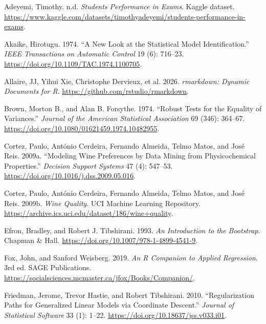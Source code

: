 \documentclass[
  10pt,
]{article}
\newlength{\cslhangindent}
\newenvironment{CSLReferences}[2] %
 {\begin{list}{}{%
  \setlength{\itemindent}{0pt}
  \setlength{\leftmargin}{0pt}
  \setlength{\parsep}{0pt}
  \ifodd #1
   \setlength{\leftmargin}{\cslhangindent}
   \setlength{\itemindent}{-1\cslhangindent}
  \fi
  \setlength{\itemsep}{#2\baselineskip}}}
 {\end{list}}
\begin{document}
\protect{}\label{refs}
\begin{CSLReferences}{1}{1}
Adeyemi, Timothy. n.d. \emph{Students Performance in Exams}. Kaggle
dataset.
\url{https://www.kaggle.com/datasets/timothyadeyemi/students-performance-in-exams}.

Akaike, Hirotugu. 1974. {``A New Look at the Statistical Model
Identification.''} \emph{IEEE Transactions on Automatic Control} 19 (6):
716--23. \url{https://doi.org/10.1109/TAC.1974.1100705}.

{Allaire, JJ, Yihui Xie, Christophe Dervieux, et al.} 2026.
\emph{rmarkdown: Dynamic Documents for R}.
\url{https://github.com/rstudio/rmarkdown}.

Brown, Morton B., and Alan B. Forsythe. 1974. {``Robust Tests for the
Equality of Variances.''} \emph{Journal of the American Statistical
Association} 69 (346): 364--67.
\url{https://doi.org/10.1080/01621459.1974.10482955}.

Cortez, Paulo, António Cerdeira, Fernando Almeida, Telmo Matos, and José
Reis. 2009a. {``Modeling Wine Preferences by Data Mining from
Physicochemical Properties.''} \emph{Decision Support Systems} 47 (4):
547--53. \url{https://doi.org/10.1016/j.dss.2009.05.016}.

Cortez, Paulo, António Cerdeira, Fernando Almeida, Telmo Matos, and José
Reis. 2009b. \emph{Wine Quality}. UCI Machine Learning Repository.
\url{https://archive.ics.uci.edu/dataset/186/wine+quality}.

Efron, Bradley, and Robert J. Tibshirani. 1993. \emph{An Introduction to
the Bootstrap}. Chapman \& Hall.
\url{https://doi.org/10.1007/978-1-4899-4541-9}.

Fox, John, and Sanford Weisberg. 2019. \emph{An R Companion to Applied
Regression}. 3rd ed. SAGE Publications.
\url{https://socialsciences.mcmaster.ca/jfox/Books/Companion/}.

Friedman, Jerome, Trevor Hastie, and Robert Tibshirani. 2010.
{``Regularization Paths for Generalized Linear Models via Coordinate
Descent.''} \emph{Journal of Statistical Software} 33 (1): 1--22.
\url{https://doi.org/10.18637/jss.v033.i01}.


\end{CSLReferences}
\end{document}

